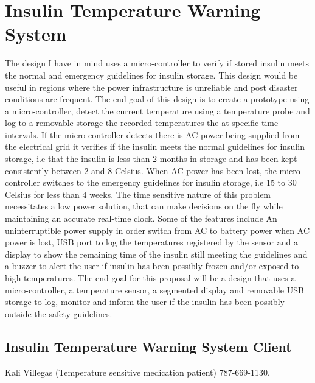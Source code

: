 \pagestyle{plain}
\chapter{Insulin Temperature Warning System}
The design I have in mind uses a micro-controller to verify if stored insulin meets the normal and emergency guidelines for insulin storage. This design would be useful in regions where the power infrastructure is unreliable and post disaster conditions are frequent. The end goal of this design is to create a prototype using a micro-controller, detect the current temperature using a temperature probe and log to a removable storage the recorded temperatures the at specific time intervals. If the micro-controller detects there is AC power being supplied from the electrical grid it verifies if the insulin meets the normal guidelines for insulin storage, i.e that the insulin is less than 2 months in storage and has been kept consistently between 2 and 8 Celsius. When AC power has been lost, the micro-controller switches to the emergency guidelines for insulin storage, i.e 15 to 30 Celsius for less than 4 weeks. The time sensitive nature of this problem necessitates a low power solution, that can make decisions on the fly while maintaining an accurate real-time clock. Some of the features include An uninterruptible power supply in order switch from AC to battery power when AC power is lost, USB port to log the temperatures registered by the sensor and a display to show the remaining time of the insulin still meeting the guidelines and a buzzer to alert the user if insulin has been possibly frozen and/or exposed to high temperatures. The end goal for this proposal will be a design that uses a micro-controller, a temperature sensor, a segmented display and removable USB storage to log, monitor and inform the user if the insulin has been possibly outside the safety guidelines.
\newpage
\section{Insulin Temperature Warning System Client}
Kali Villegas (Temperature sensitive medication patient) 787-669-1130.
